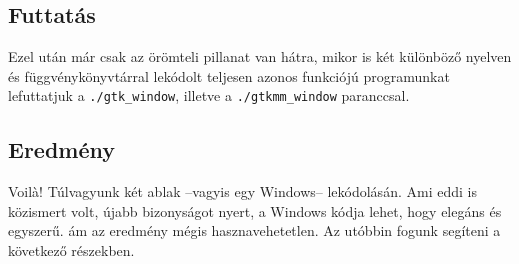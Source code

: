 \subsection{Futtatás}

Ezel után már csak az örömteli pillanat van hátra, mikor is két különböző nyelven és függvénykönyvtárral lekódolt teljesen azonos funkciójú programunkat lefuttatjuk a \texttt{./gtk\_window}, illetve a \texttt{./gtkmm\_window} paranccsal.

\subsection{Eredmény}

Voil\`{a}! Túlvagyunk két ablak --vagyis egy Windows-- lekódolásán. Ami eddi is közismert volt, újabb bizonyságot nyert, a Windows kódja lehet, hogy elegáns és egyszerű. ám az eredmény mégis hasznavehetetlen. Az utóbbin fogunk segíteni a következő részekben.
